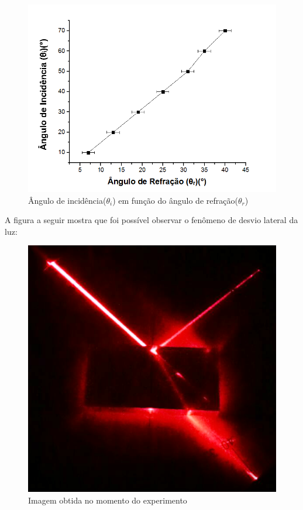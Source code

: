 \documentclass[
	12pt,				%
	oneside,			%
	a4paper,			%
	english,			%
	french,				%
	spanish,			%
	brazil				%
	]{abntex2}
\begin{document}
\begin{figure}[htb]
	\centering
	\includegraphics[scale=0.7]{Grafico1.png} 
	\caption{Ângulo de incidência($\theta_i$) em função do ângulo de refração($\theta_r$)}
	\label{figura-grafico2}
\end{figure}
\newpage

A figura a seguir mostra que foi possível observar o fenômeno de desvio lateral da luz:

\begin{figure}[htb]
	\centering
	\includegraphics[scale=0.8]{desvio.png}
	\caption{Imagem obtida no momento do experimento}
	\label{figura-8}
\end{figure}
\end{document}
